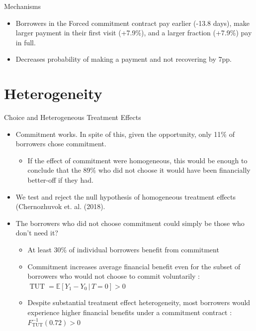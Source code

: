 \documentclass[8pt]{beamer}
\begin{document}
\begin{frame}{Mechanisms}
\label{intermediate_outcomes}
 \begin{itemize}
     \item Borrowers in the Forced commitment contract pay earlier (-13.8 days), make larger payment in their first visit (+7.9\%), and a larger fraction (+7.9\%) pay in full.
       
        \item Decreases probability of making a payment and not recovering by 7pp.
    \end{itemize}

   \vfill
   
   \hyperlink{mechanism_appendix}{}
\end{frame}


\section{Heterogeneity}
\begin{frame}{Choice and Heterogeneous Treatment Effects}
\label{choice_hte}
    \begin{itemize}
    \vfill    \item   Commitment works.   In spite of this, given the  opportunity,  only 11\%  of  borrowers  chose  commitment.   
    \begin{itemize}
       \pause \item If  the  effect  of  commitment  were homogeneous, this would be enough to conclude that the 89\% who did not choose it would have been financially better-off if they had.
    \end{itemize}
    
    \vfill \pause \item We test and reject the null hypothesis of homogeneous treatment effects (Chernozhuvok et. al. (2018).
    
    \vfill \pause \item The borrowers who did not choose commitment could simply be those who don’t need it?
    
    \begin{itemize}
       \pause \item At least 30\% of individual borrowers benefit from commitment \hyperlink{fan_park_bounds}{}
       \pause \item Commitment increases average financial benefit even for the subset of borrowers who would not choose to commit voluntarily : $\operatorname{TUT}=\mathbb{E}[Y_1-Y_0\,|\, T=0]>0$ \hyperlink{rc_design}{}
       \pause \item Despite substantial treatment effect heterogeneity, most borrowers would experience higher financial benefits under a commitment contract : $F_{\operatorname{TUT}}^{-1}(0.72)>0$
    \end{itemize}
    \end{itemize}
\end{frame}
\end{document}

